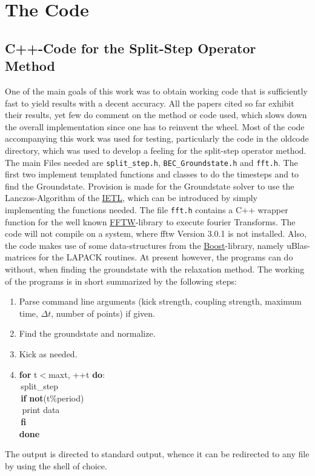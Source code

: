 	
\section{The Code}
\subsection{C++-Code for the Split-Step Operator Method}
One of the main goals of this work was to obtain working code that is sufficiently fast to yield results with a decent accuracy.  All the papers cited so far exhibit their results, yet few do comment on the
method or code used, which slows down the overall implementation since one has to reinvent the wheel. Most of the code accompanying this work was used for testing,
particularly the code in the oldcode directory, which was used to develop a feeling for the split-step operator method. The main Files needed are
\texttt{split\_step.h}, 
\texttt{BEC\_Groundstate.h} and \texttt{fft.h}. The first two implement templated functions and classes to do the timesteps and to find the Groundstate. Provision is made
for the Groundstate solver to use the Lanczos-Algorithm of the \href{http://www.comp-phys.org/software/ietl/ietl.html}{IETL}, which can be introduced by simply
implementing the functions needed. The file \texttt{fft.h} contains a C++ wrapper function for the well known \href{http://www.fftw.org}{FFTW}-library to execute
fourier Transforms. The code will not compile on a system, where fftw Version 3.0.1 is not installed. Also, the code makes use of some data-structures from the
\href{http://www.boost.org}{Boost}-library, namely uBlas-matrices for the LAPACK routines. At present however, the programs can do without, when finding the
groundstate with the relaxation method.
The working of the programs is in short summarized by the following steps:
\begin{enumerate}
	\item Parse command line arguments (kick strength, coupling strength, maximum time, $\Delta t$, number of points) if given.
	\item Find the groundstate and normalize.
	\item Kick as needed.
	\item 
		\textbf{for} t$<$maxt, ++t \textbf{do}:\\
			\,split\_step\\
			\,\textbf{if} \textbf{not}(t\%period)\\
				\,\,print data\\
			\,\textbf{fi}\\
		\textbf{done}\\
\end{enumerate}
The output is directed to standard output, whence it can be redirected to any file by using the shell of choice.
